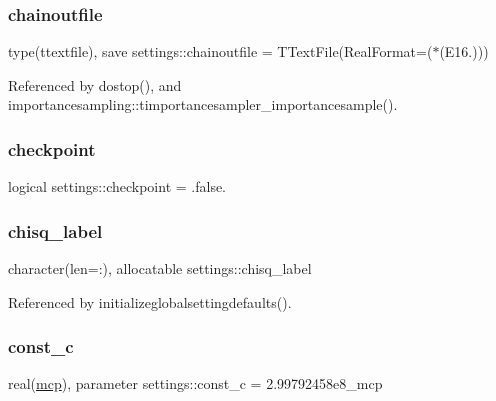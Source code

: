 \subsubsection{\texorpdfstring{chainoutfile}{chainoutfile}}
{\footnotesize\ttfamily type(ttextfile), save settings\+::chainoutfile = T\+Text\+File(Real\+Format=\textquotesingle{}($\ast$(E16.))\textquotesingle{})}



Referenced by dostop(), and importancesampling\+::timportancesampler\+\_\+importancesample().

\mbox{\label{namespacesettings_ae0817081d233f3c5d76fad556a766afb}} 
\subsubsection{\texorpdfstring{checkpoint}{checkpoint}}
{\footnotesize\ttfamily logical settings\+::checkpoint = .false.}

\mbox{\label{namespacesettings_a493eb241cf271ca0ba4da755bc6b13d1}} 
\subsubsection{\texorpdfstring{chisq\+\_\+label}{chisq\_label}}
{\footnotesize\ttfamily character(len=\+:), allocatable settings\+::chisq\+\_\+label}



Referenced by initializeglobalsettingdefaults().

\mbox{\label{namespacesettings_a9aec23a6e1d47760b93c79084ddacd3c}} 
\subsubsection{\texorpdfstring{const\+\_\+c}{const\_c}}
{\footnotesize\ttfamily real(\mbox{\hyperlink{namespacesettings_a341fa0fe410054f78630c33e118669bf}{mcp}}), parameter settings\+::const\+\_\+c = 2.\+99792458e8\+\_\+mcp}



